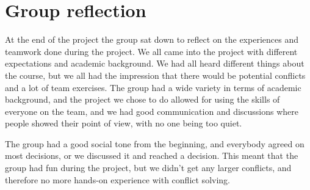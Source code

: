 \chapter{Group reflection}
\label{chap:reflection}
%
At the end of the project the group sat down to reflect on the experiences and teamwork done during the project. We all came into the project with different expectations and academic background. We had all heard different things about the course, but we all had the impression that there would be potential conflicts and a lot of team exercises. The group had a wide variety in terms of academic background, and the project we chose to do allowed for using the skills of everyone on the team, and we had good communication and discussions where people showed their point of view, with no one being too quiet. 

The group had a good social tone from the beginning, and everybody agreed on most decisions, or we discussed it and reached a decision. This meant that the group had fun during the project, but we didn't get any larger conflicts, and therefore no more hands-on experience with conflict solving.